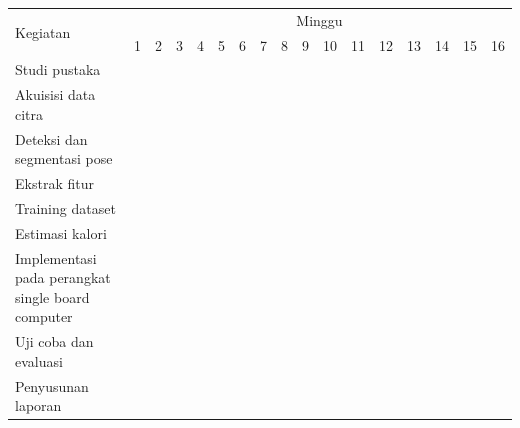 \newcommand{\w}{}
\newcommand{\G}{\cellcolor{gray}}
\begin{table}[h!]
  \begin{tabular}{|p{3.5cm}|c|c|c|c|c|c|c|c|c|c|c|c|c|c|c|c|}

    \hline
    \multirow{2}{*}{Kegiatan} & \multicolumn{16}{|c|}{Minggu} \\
    \cline{2-17} &
    1 & 2 & 3 & 4 & 5 & 6 & 7 & 8 & 9 & 10 & 11 & 12 & 13 & 14 & 15 & 16 \\
    \hline

    Studi pustaka &
    \G & \G & \G & \G & \w & \w & \w & \w & \w & \w & \w & \w & \w & \w & \w & \w \\
    \hline

    Akuisisi data citra &
    \w & \w & \G & \G & \G & \w & \w & \w & \w & \w & \w & \w & \w & \w & \w & \w \\
    \hline

    Deteksi dan segmentasi pose &
    \w & \w & \w & \G & \G & \G & \w & \w & \w & \w & \w & \w & \w & \w & \w & \w \\
    \hline

    Ekstrak fitur &
    \w & \w & \w & \w & \G & \G & \G & \w & \w & \w & \w & \w & \w & \w & \w & \w \\
    \hline

    Training dataset &
    \w & \w & \w & \w & \G & \G & \G & \G & \w & \w & \w & \w & \w & \w & \w & \w \\
    \hline

    Estimasi kalori &
    \w & \w & \w & \w & \w & \w & \G & \G & \G & \G & \G & \G & \w & \w & \w & \w \\
    \hline

    Implementasi pada perangkat single board computer &
    \w & \w & \w & \w & \w & \w & \w & \w & \w & \w & \w & \G & \G & \G & \w & \w \\
    \hline

    Uji coba dan evaluasi &
    \w & \w & \w & \w & \w & \w & \G & \G & \G & \G & \G & \G & \G & \G & \G & \w \\
    \hline

    Penyusunan laporan &
    \G & \G & \G & \G & \G & \G & \G & \G & \G & \G & \G & \G & \G & \G & \G & \G \\
    \hline

  \end{tabular}
\end{table}
